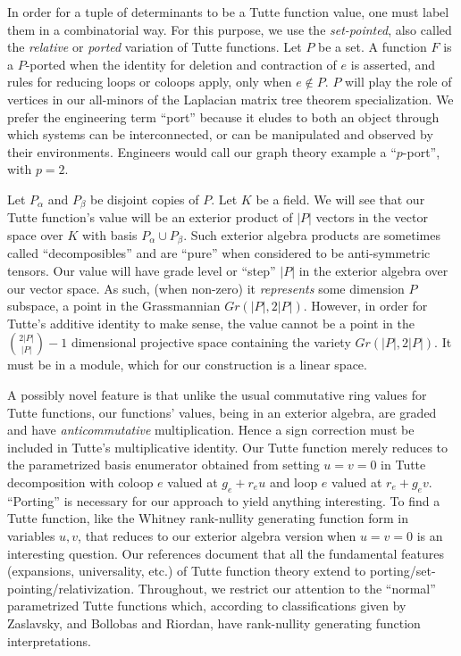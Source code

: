 \documentclass[Unicode]{cedram-alco}
\begin{document}
In order for a tuple of determinants to be a Tutte function value, one
must label them in a combinatorial way.  For this purpose, we use
the \emph{set-pointed}\cite{SetPointedLV}, also called the
\emph{relative}\cite{RelTuttePolyDiaoHetyei} or
\emph{ported}\cite{sdcPorted,TutteEx}
variation of Tutte functions.  Let $P$ be a set.  A function $F$ is a $P$-ported
when the identity for deletion and contraction of $e$ is asserted,
and rules for reducing loops or coloops apply, only when $e \not\in P$.
$P$ will play the role of vertices in our all-minors of the Laplacian
matrix tree theorem specialization.
We prefer the engineering term ``port'' because it eludes to both an object through
which systems can be interconnected, or can be manipulated and observed by their
environments.  Engineers would call our graph theory example a ``$p$-port'', with
$p=2$.

Let $P_{\alpha}$ and $P_{\beta}$ be disjoint copies of $P$.  Let $K$ be a field.
We will see that our Tutte function's value will be an exterior product of
$|P|$ vectors in the vector space over $K$ with basis $P_\alpha \cup P_\beta$.
Such exterior algebra products are sometimes called ``decomposibles''\cite{MarcusFDMuAlPt2}
and are ``pure'' when considered to be anti-symmetric tensors.  Our value will
have grade level or ``step''  $|P|$ in the exterior algebra over our
vector space.
As such, (when non-zero)
it \emph{represents} some
dimension $P$ subspace, a point in the Grassmannian $Gr(|P|,2|P|)$.
However, in order for Tutte's additive identity to make sense, the value cannot be
a point in the $\binom{2|P|}{|P|}-1$ dimensional projective space
containing the variety $Gr(|P|,2|P|)$.  It must be in a module, which for
our construction is a linear space.

A possibly novel feature is that unlike the usual commutative ring values for Tutte
functions, our functions' values, being in an exterior algebra, are graded and have
\emph{anticommutative} multiplication.
Hence a sign correction must be included in Tutte's multiplicative
identity.  Our Tutte function merely reduces to the parametrized
basis enumerator obtained from setting $u=v=0$ in Tutte
decomposition with coloop $e$ valued at $g_e+r_eu$ and loop $e$ valued at $r_e+g_ev$.
``Porting'' is necessary for our approach to yield anything
interesting. To find a Tutte function, like the Whitney rank-nullity
generating function form in variables $u,v$, that reduces to our exterior
algebra version when $u=v=0$ is an interesting question.
Our
references\cite{MR0419272,SetPointedLV,sdcPorted,TutteEx,RelTuttePolyDiaoHetyei}
document that all the fundamental features
(expansions, universality, etc.)
of Tutte function theory extend to porting/set-pointing/relativization.  Throughout,
we restrict our attention to the ``normal'' parametrized Tutte functions which, according
to classifications given by Zaslavsky\cite{MR93a:05047},
and Bollobas and Riordan\cite{BollobasRiordanTuttePolyColored},
have rank-nullity generating function interpretations. 
\end{document}
